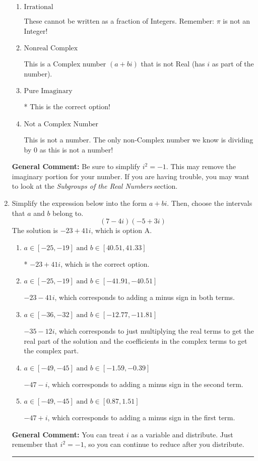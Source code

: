 \documentclass{extbook}[14pt]
\newcommand{\litem}[1]{\item #1

\rule{\textwidth}{0.4pt}}
\begin{document}
\begin{enumerate}
{\begin{enumerate}[label=\Alph*.]
These are numbers that can be written as fraction of Integers (e.g., -2/3 + 5)
\item \( \text{Irrational} \)

These cannot be written as a fraction of Integers. Remember: $\pi$ is not an Integer!
\item \( \text{Nonreal Complex} \)

This is a Complex number $(a+bi)$ that is not Real (has $i$ as part of the number).
\item \( \text{Pure Imaginary} \)

* This is the correct option!
\item \( \text{Not a Complex Number} \)

This is not a number. The only non-Complex number we know is dividing by 0 as this is not a number!
\end{enumerate}

\textbf{General Comment:} Be sure to simplify $i^2 = -1$. This may remove the imaginary portion for your number. If you are having trouble, you may want to look at the \textit{Subgroups of the Real Numbers} section.
}
\litem{
Simplify the expression below into the form $a+bi$. Then, choose the intervals that $a$ and $b$ belong to.
\[ (7 - 4 i)(-5 + 3 i) \]The solution is \( -23 + 41 i \), which is option A.\begin{enumerate}[label=\Alph*.]
\item \( a \in [-25, -19] \text{ and } b \in [40.51, 41.33] \)

* $-23 + 41 i$, which is the correct option.
\item \( a \in [-25, -19] \text{ and } b \in [-41.91, -40.51] \)

 $-23 - 41 i$, which corresponds to adding a minus sign in both terms.
\item \( a \in [-36, -32] \text{ and } b \in [-12.77, -11.81] \)

 $-35 - 12 i$, which corresponds to just multiplying the real terms to get the real part of the solution and the coefficients in the complex terms to get the complex part.
\item \( a \in [-49, -45] \text{ and } b \in [-1.59, -0.39] \)

 $-47 - i$, which corresponds to adding a minus sign in the second term.
\item \( a \in [-49, -45] \text{ and } b \in [0.87, 1.51] \)

 $-47 + i$, which corresponds to adding a minus sign in the first term.
\end{enumerate}

\textbf{General Comment:} You can treat $i$ as a variable and distribute. Just remember that $i^2=-1$, so you can continue to reduce after you distribute.
}
\end{enumerate}
\end{document}
